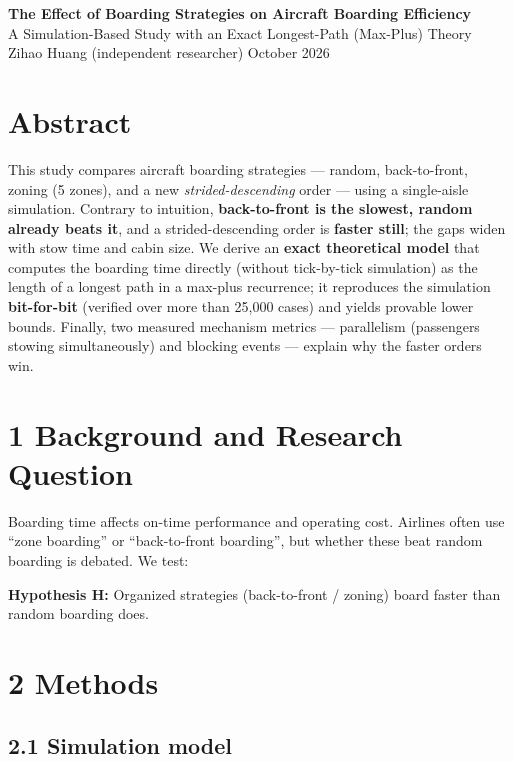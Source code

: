 \documentclass[
  11pt,
  a4paper]{article}
\author{}
\date{}
\begin{document}
\begin{center}
{\LARGE\bfseries The Effect of Boarding Strategies on Aircraft Boarding Efficiency}\\[6pt]
{\large A Simulation-Based Study with an Exact Longest-Path (Max-Plus) Theory}\\[8pt]
Zihao Huang (independent researcher) \quad October 2026
\end{center}
\vspace{6pt}

\section{Abstract}\label{abstract}

This study compares aircraft boarding strategies --- random,
back-to-front, zoning (5 zones), and a new \emph{strided-descending}
order --- using a single-aisle simulation. Contrary to intuition,
\textbf{back-to-front is the slowest, random already beats it}, and a
strided-descending order is \textbf{faster still}; the gaps widen with
stow time and cabin size. We derive an \textbf{exact theoretical model}
that computes the boarding time directly (without tick-by-tick
simulation) as the length of a longest path in a max-plus recurrence; it
reproduces the simulation \textbf{bit-for-bit} (verified over more than
25,000 cases) and yields provable lower bounds. Finally, two measured
mechanism metrics --- parallelism (passengers stowing simultaneously)
and blocking events --- explain why the faster orders win.

\section{1 Background and Research
Question}\label{background-and-research-question}

Boarding time affects on-time performance and operating cost. Airlines
often use ``zone boarding'' or ``back-to-front boarding'', but whether
these beat random boarding is debated. We test:

\textbf{Hypothesis H:} Organized strategies (back-to-front / zoning)
board faster than random boarding does.

\section{2 Methods}\label{methods}

\subsection{2.1 Simulation model}\label{simulation-model}
\end{document}
